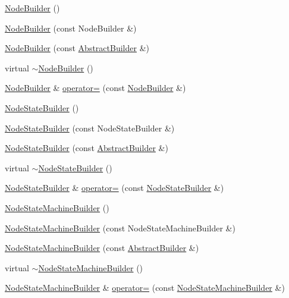 \begin{DoxyCompactItemize}
\item 
\hyperlink{namespacejli_a1a43fda7f472452c5ded41130fe22e58}{Node\+Builder} ()
\item 
\hyperlink{namespacejli_a75dc0cad5c84f4d244d951b48255c6e4}{Node\+Builder} (const Node\+Builder \&)
\item 
\hyperlink{namespacejli_a3250e1d2e7ab6f0467839d9ff2f57dcb}{Node\+Builder} (const \hyperlink{classjli_1_1_abstract_builder}{Abstract\+Builder} \&)
\item 
virtual \hyperlink{namespacejli_ac5033296b7700d3610c8d224889de6c6}{$\sim$\+Node\+Builder} ()
\item 
\hyperlink{namespacejli_a1a43fda7f472452c5ded41130fe22e58}{Node\+Builder} \& \hyperlink{namespacejli_a290ea917337c90571eb741852c146180}{operator=} (const \hyperlink{namespacejli_a1a43fda7f472452c5ded41130fe22e58}{Node\+Builder} \&)
\item 
\hyperlink{namespacejli_ad70606423ba47ece479deb3b757a42e5}{Node\+State\+Builder} ()
\item 
\hyperlink{namespacejli_a78725e600cad00a294f5be3a2674163d}{Node\+State\+Builder} (const Node\+State\+Builder \&)
\item 
\hyperlink{namespacejli_ad7d29c5caed8d28beb18d7aad8557e16}{Node\+State\+Builder} (const \hyperlink{classjli_1_1_abstract_builder}{Abstract\+Builder} \&)
\item 
virtual \hyperlink{namespacejli_a382e5a3962b4c615dfb92bebf284be3a}{$\sim$\+Node\+State\+Builder} ()
\item 
\hyperlink{namespacejli_ad70606423ba47ece479deb3b757a42e5}{Node\+State\+Builder} \& \hyperlink{namespacejli_ae585c3410d7d13aa692693c33109921b}{operator=} (const \hyperlink{namespacejli_ad70606423ba47ece479deb3b757a42e5}{Node\+State\+Builder} \&)
\item 
\hyperlink{namespacejli_a5450578105c2ad80ffbffb6217dd6836}{Node\+State\+Machine\+Builder} ()
\item 
\hyperlink{namespacejli_a06186588a8ae9389c430a11eec9be096}{Node\+State\+Machine\+Builder} (const Node\+State\+Machine\+Builder \&)
\item 
\hyperlink{namespacejli_aff87da2924105e676038ee9cc69b3280}{Node\+State\+Machine\+Builder} (const \hyperlink{classjli_1_1_abstract_builder}{Abstract\+Builder} \&)
\item 
virtual \hyperlink{namespacejli_a54fbaea9a0b6572e95afe297e219dbda}{$\sim$\+Node\+State\+Machine\+Builder} ()
\item 
\hyperlink{namespacejli_a5450578105c2ad80ffbffb6217dd6836}{Node\+State\+Machine\+Builder} \& \hyperlink{namespacejli_a2f297f06b646c4b46e49a5144c8c71c1}{operator=} (const \hyperlink{namespacejli_a5450578105c2ad80ffbffb6217dd6836}{Node\+State\+Machine\+Builder} \&)

\end{DoxyCompactItemize}
